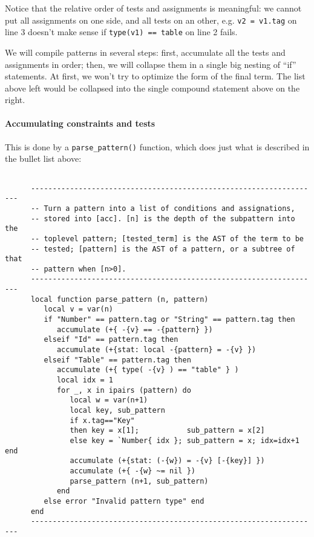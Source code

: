 Notice that the relative order of tests and assignments is meaningful:
we cannot put all assignments on one side, and all tests on an
other, e.g. \verb|v2 = v1.tag| on line 3 doesn't make sense if
\verb|type(v1) == table| on line 2 fails.

We will compile patterns in several steps: first, accumulate all the
tests and assignments in order; then, we will collapse them in a
single big nesting of ``if'' statements. At first, we won't try
to optimize the form of the final term. The list above left would be
collapsed into the single compound statement above on the right.

\paragraph{Accumulating constraints and tests}
This is done by a \verb|parse_pattern()| function, which does just what
is described in the bullet list above:

\begin{Verbatim}[fontsize=\scriptsize]

      -------------------------------------------------------------------
      -- Turn a pattern into a list of conditions and assignations,
      -- stored into [acc]. [n] is the depth of the subpattern into the
      -- toplevel pattern; [tested_term] is the AST of the term to be 
      -- tested; [pattern] is the AST of a pattern, or a subtree of that
      -- pattern when [n>0].
      -------------------------------------------------------------------
      local function parse_pattern (n, pattern)
         local v = var(n)
         if "Number" == pattern.tag or "String" == pattern.tag then
            accumulate (+{ -{v} == -{pattern} })
         elseif "Id" == pattern.tag then
            accumulate (+{stat: local -{pattern} = -{v} })
         elseif "Table" == pattern.tag then
            accumulate (+{ type( -{v} ) == "table" } )
            local idx = 1
            for _, x in ipairs (pattern) do
               local w = var(n+1)
               local key, sub_pattern
               if x.tag=="Key" 
               then key = x[1];           sub_pattern = x[2]
               else key = `Number{ idx }; sub_pattern = x; idx=idx+1 end
               accumulate (+{stat: (-{w}) = -{v} [-{key}] })
               accumulate (+{ -{w} ~= nil })
               parse_pattern (n+1, sub_pattern)
            end
         else error "Invalid pattern type" end
      end
      -------------------------------------------------------------------
\end{Verbatim}

